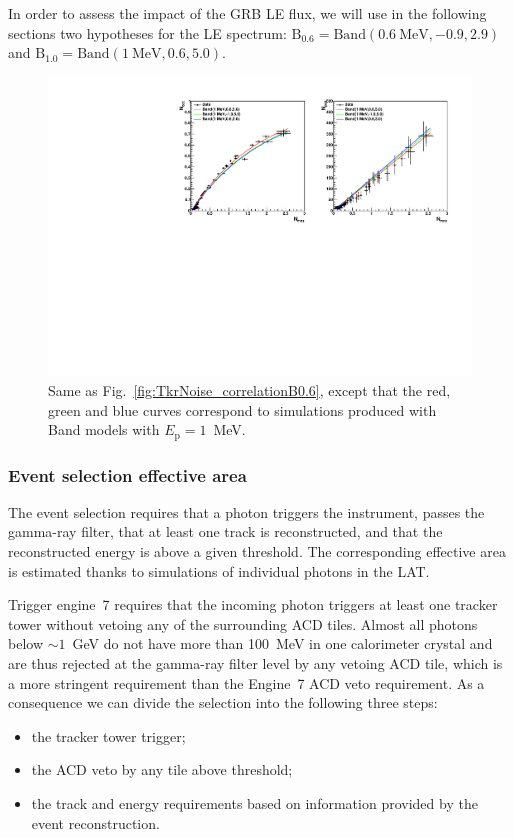 \documentclass[preprint]{aastex631}
\begin{document}
In order to assess the impact of the GRB LE flux, we will use in the following sections two hypotheses for the LE spectrum: $\mathrm{B}_{0.6} = \mathrm{Band}(0.6~\mathrm{MeV},-0.9,2.9)$ and $\mathrm{B}_{1.0} = \mathrm{Band}(1~\mathrm{MeV},0.6,5.0)$.

\begin{figure}[t]
    \centering
    \includegraphics[width=0.9\linewidth]{paper_compcheckTkrNoiseInCornerB0p0.pdf}
    \caption{Same as Fig.~\ref{fig:TkrNoise_correlationB0.6}, except that the red, green and blue curves correspond to simulations produced with Band models with $E_\mathrm{p} = 1$~MeV.}
    \label{fig:TkrNoise_correlationB1.0}
\end{figure}

\subsubsection{Event selection effective area}

The event selection requires that a photon triggers the instrument, passes the gamma-ray filter, that at least one track is reconstructed, and that the reconstructed energy is above a given threshold. The corresponding effective area is estimated thanks to simulations of individual photons in the LAT.

Trigger engine~7 requires that the incoming photon triggers at least one tracker tower without vetoing any of the surrounding ACD tiles. Almost all photons below $\sim 1$~GeV do not have more than 100~MeV in one calorimeter crystal and are thus rejected at the gamma-ray filter level by any vetoing ACD tile, which is a more stringent requirement than the Engine~7 ACD veto requirement. As a consequence we can divide the selection into the following three steps:
\begin{itemize}
    \item the tracker tower trigger;
    \item the ACD veto by any tile above threshold;
    \item the track and energy requirements based on information provided by the event reconstruction.
\end{itemize}
\end{document}

